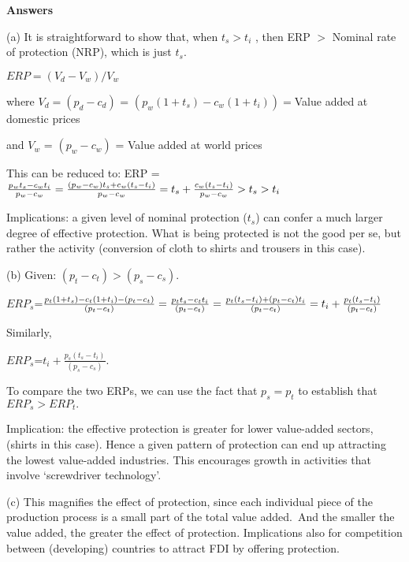 \textbf{Answers}

(a) It is straightforward to show that, when $t_{s}>t_{i}$ , then ERP $>$ Nominal rate of protection (NRP), which is just 
$t_{s}$.

$ERP=(V_{d}-V_{w})/V_{w}$

where $V_{d}=(p_{d}-c_{d})$ = $(p_{w}(1+t_{s})-c_{w}(1+t_{i}))=$Value added
at domestic prices

and $V_{w}$ = $(p_{w}-c_{w})$ = Value added at world prices

This can be reduced to: ERP = $\frac{p_{w}t_{s}-c_{w}t_{i}}{p_{w}-c_{w}}=%
\frac{(p_{w}-c_{w})t_{s}+c_{w}(t_{s}-t_{i})}{p_{w}-c_{w}}=t_{s}+\frac{%
c_{w}(t_{s}-t_{i})}{p_{w}-c_{w}}>t_{s}>t_{i}$

Implications: a given level of nominal protection ($t_{s}$) can confer a
much larger degree of effective protection. What is being protected is not
the good per se, but rather the activity (conversion of cloth to shirts and
trousers in this case).

(b) Given: $(p_{t}-c_{t})>(p_{s}-c_{s}).$

$ERP_{s}$=$\frac{p_{t}(1+t_{s})-c_{t}(1+t_{i})-(p_{t}-c_{t})}{(p_{t}-c_{t})}=%
\frac{p_{t}t_{s}-c_{t}t_{i}}{(p_{t}-c_{t})}=\frac{%
p_{t}(t_{s}-t_{i})+(p_{t}-c_{t})t_{i}}{(p_{t}-c_{t})}=t_{i}+\frac{%
p_{t}(t_{s}-t_{i})}{(p_{t}-c_{t})}$

Similarly,

$ERP_{s}$=$t_{i}+\frac{p_{s}(t_{s}-t_{i})}{(p_{s}-c_{s})}.$

To compare the two ERPs, we can use the fact that $p_{s}=p_{t}$ to establish
that $ERP_{s}>ERP_{t}.$

Implication: the effective protection is greater for lower value-added
sectors, (shirts in this case). Hence a given pattern of protection can end
up attracting the lowest value-added industries. This encourages growth in
activities that involve `screwdriver technology'.

(c) This magnifies the effect of protection, since each individual piece of
the production process is a small part of the total value added.\ And the
smaller the value added, the greater the effect of protection. Implications
also for competition between (developing) countries to attract FDI by
offering protection.

\bigskip

